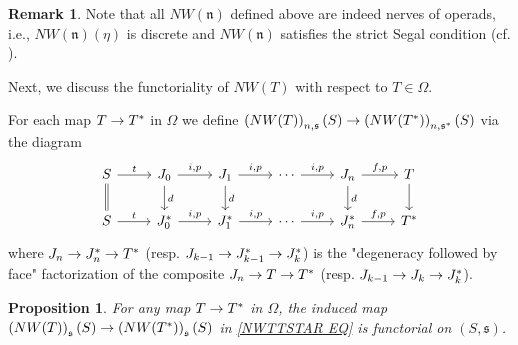 \documentclass[a4paper,10pt]{article}%
\numberwithin{equation}{section}
\numberwithin{figure}{section}
\newtheorem{proposition}[equation]{Proposition}%
\theoremstyle{definition} %
\newtheorem{remark}[equation]{Remark}%
\newcommand{\1}{\ensuremath{\mathbbm 1}}%
\begin{document}
\begin{remark}
	Note that all
	$NW(\mathfrak{n})$ defined above are indeed nerves of operads,
	i.e., 
	$NW(\mathfrak{n})(\eta)$ is discrete
	and
	$NW(\mathfrak{n})$ satisfies the strict Segal condition
	(cf. \cite[Cor 3.69]{BP_geo}).
\end{remark}



Next, we discuss the functoriality of
$NW(T)$ with respect to $T \in \Omega$.

For each map $T \to T^{\**}$ in $\Omega$
we define
$\left(NW(T)\right)_{n,\mathfrak{s}}(S)
	\to 
\left(NW(T^{\**})\right)_{n,\mathfrak{s}^{\**}}(S)$
via the diagram
\begin{equation}\label{NWTTSTAR EQ}
\begin{tikzcd}
	S \ar{r}{t} \ar[equal]{d}
&
	J_0 \ar{r}{i,p} \ar{d}{d}
&
	J_1 \ar{r}{i,p} \ar{d}{d}
&
	\cdots \ar{r}{i,p}
&
	J_n \ar{r}{f,p} \ar{d}{d}
&
	T \ar{d}
\\
	S \ar{r}{t} 
&
	J^{\**}_0 \ar{r}{i,p}
&
	J^{\**}_1 \ar{r}{i,p}
&
	\cdots \ar{r}{i,p}
&
	J^{\**}_n \ar{r}{f,p}
&
	T^{\**}
\end{tikzcd}
\end{equation}
where
$J_n \to J^{\**}_n \to T^{\**}$
(resp. 
$J_{k-1} \to J^{\**}_{k-1} \to J^{\**}_k$)
is the "degeneracy followed by face"
factorization of the composite
$J_n \to T \to T^{\**}$
(resp.
$J_{k-1} \to J_{k} \to J^{\**}_k$).




\begin{proposition}
	For any map $T \to T^{\**}$ in $\Omega$, the induced map
	$\left(NW(T)\right)_{\mathfrak{s}}(S)
	\to 
	\left(NW(T^{\**})\right)_{\mathfrak{s}}(S)$
	in 
	\eqref{NWTTSTAR EQ}
	is functorial on $(S,\mathfrak{s})$.
\end{proposition}
\end{document}
